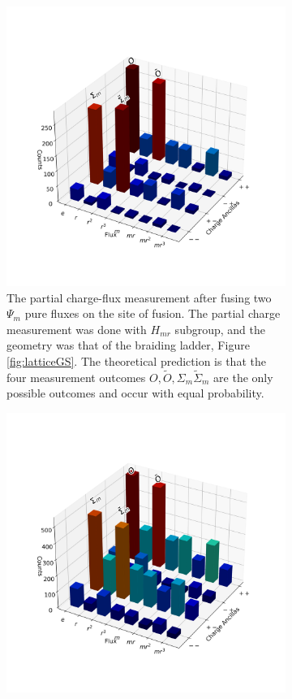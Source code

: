 \documentclass[two column]{article}
\begin{document}
\begin{figure}
\centering
\begin{subfigure}{0.47\textwidth}
    \includegraphics[width = \linewidth]{Figures/fusion_on_glasses.png}
    \caption{The partial charge-flux measurement after fusing two $\Psi_m$ pure fluxes on the site of fusion. The partial charge measurement was done with $H_{mr}$ subgroup, and the geometry was that of the braiding ladder, Figure \ref{fig:latticeGS}. The theoretical prediction is that the four measurement outcomes $O,\tilde O,\Sigma_m \tilde{\Sigma}_m$ are the only possible outcomes and occur with equal probability.}
    \label{fig:fusion_glass}
\end{subfigure}\hfill
\begin{subfigure}{0.47\textwidth}
    \includegraphics[width=\linewidth]{Figures/fusion_on_basketball.png}

\end{subfigure}
\end{figure}
\end{document}
